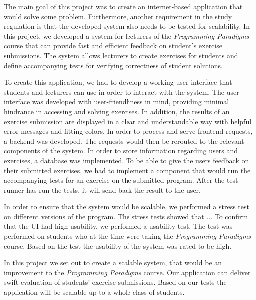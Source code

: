 The main goal of this project was to create an internet-based application that would solve some problem.
Furthermore, another requirement in the study regulation is that the developed system also needs to be tested for scalability. 
In this project, we developed a system for lecturers of the \textit{Programming Paradigms} course that can provide fast and efficient feedback on student's exercise submissions.
The system allows lecturers to create exercises for students and define accompanying tests for verifying correctness of student solutions.

To create this application, we had to develop a working user interface that students and lecturers can use in order to interact with the system. 
The user interface was developed with user-friendliness in mind, providing minimal hindrance in accessing and solving exercises. 
In addition, the results of an exercise submission are displayed in a clear and understandable way with helpful error messages and fitting colors.
In order to process and serve frontend requests, a backend was developed.
The requests would then be rerouted to the relevant components of the system. 
In order to store information regarding users and exercises, a database was implemented.
To be able to give the users feedback on their submitted exercises, we had to implement a component that would run the accompanying tests for an exercise on the submitted program. 
After the test runner has run the tests, it will send back the result to the user.

In order to ensure that the system would be scalable, we performed a stress test on different versions of the program. 
The stress tests showed that ... 
To confirm that the UI had high usability, we performed a usability test.
The test was performed on students who at the time were taking the \textit{Programming Paradigms} course.
Based on the test the usability of the system was rated to be high.  

In this project we set out to create a scalable system, that would be an improvement to the \textit{Programming Paradigms} course.
Our application can deliver swift evaluation of students' exercise submissions. Based on our tests the application will be scalable up to a whole class of students.
